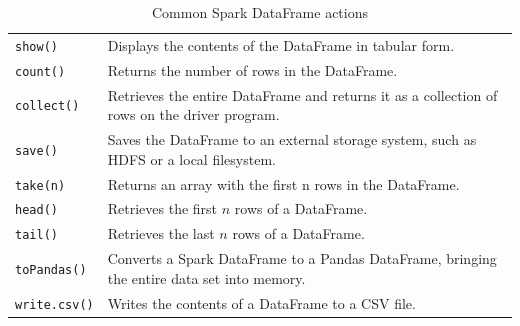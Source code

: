 \begin{advanced}
\begin{table}
\renewcommand{\arraystretch}{1.25}

\begin{tabularx}{\textwidth}{l|X} \hline
\texttt{show()} & Displays the contents of the DataFrame in tabular form.\\
\texttt{count()} & Returns the number of rows in the DataFrame.\\
\texttt{collect()} & Retrieves the entire DataFrame and returns it as a collection of rows on the driver program.\\
\texttt{save()} & Saves the DataFrame to an external storage system, such as HDFS or a local filesystem.\\
\texttt{take(n)} & Returns an array with the first n rows in the DataFrame.\\
\texttt{head()} & Retrieves the first $n$ rows of a DataFrame.\\
\texttt{tail()} & Retrieves the last $n$ rows of a DataFrame.\\
\texttt{toPandas()} & Converts a Spark DataFrame to a Pandas DataFrame, bringing the entire data set into memory.\\
\texttt{write.csv()} & Writes the contents of a DataFrame to a CSV file.\\ \hline
\end{tabularx}
\caption{Common Spark DataFrame actions}
\label{tab:sparkactions}
\end{table}
\end{advanced}

